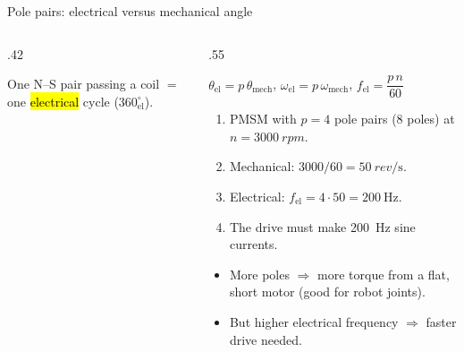 \documentclass[aspectratio=169,10pt]{beamer}
\begin{document}
\begin{frame}{Pole pairs: electrical versus mechanical angle}
\begin{columns}[T]
\begin{column}{.42\textwidth}
\centering
{}

\vspace{1mm}
\small
One N--S pair passing a coil $=$ one \hl{electrical} cycle ($360^\circ_\text{el}$).
\end{column}
\begin{column}{.55\textwidth}
\small
\begin{eqbox}
$\theta_\text{el}=p\,\theta_\text{mech}$, \qquad $\omega_\text{el}=p\,\omega_\text{mech}$, \qquad $f_\text{el}=\dfrac{p\,n}{60}$
\end{eqbox}
\begin{defbox}
\small
\begin{enumerate}\setlength\itemsep{1pt}
\item PMSM with $p=4$ pole pairs (8 poles) at $n=\SI{3000}{rpm}$.
\item Mechanical: $3000/60=\SI{50}{rev\per\second}$.
\item Electrical: $f_\text{el}=4\cdot50=\SI{200}{\hertz}$.
\item The drive must make \SI{200}{\hertz} sine currents.
\end{enumerate}
\end{defbox}
\begin{itemize}\setlength\itemsep{1pt}
\item More poles $\Rightarrow$ more torque from a flat, short motor (good for robot joints).
\item But higher electrical frequency $\Rightarrow$ faster drive needed.
\end{itemize}
\end{column}
\end{columns}
\end{frame}
\end{document}

